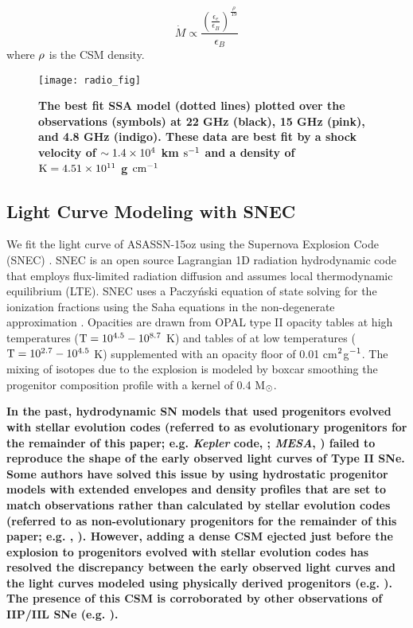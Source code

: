 \documentclass[a4paper,fleqn,usenatbib]{mnras}
\newcommand{\msunperiod}{M$\rm{_{\odot}}$}
\begin{document}
\begin{equation}
\dot{M} \propto \frac{\left(  \frac{\epsilon_{e}}{\epsilon_{B}}\right)^{\frac{\rho}{19}}} {\epsilon_{B}}
\end{equation}
where $\rm{\rho}$ is the CSM density.
\begin{figure}
\begin{center}
\texttt{[image: radio\_fig]}
\caption{\textbf{The best fit SSA model (dotted lines) plotted over the observations (symbols) at 22 GHz (black), 15 GHz (pink), and 4.8 GHz (indigo).
These data are best fit by a shock velocity of $\rm{\sim 1.4\times10^{4}}$ km $\rm{s^{-1}}$ and a density of $\rm{K = 4.51\times 10^{11}}$ g $\rm{cm^{-1}}$}}
\label{fig:radio}
\end{center}
\end{figure}
\subsection{Light Curve Modeling with SNEC}\label{sec:LCmodeling}
We fit the light curve of ASASSN-15oz using the Supernova Explosion Code (SNEC) \citep{2015morozova}.
SNEC is an open source Lagrangian 1D radiation hydrodynamic code that employs flux-limited radiation diffusion and assumes local thermodynamic equilibrium (LTE).
SNEC uses a Paczy\'nski equation of state \citep{1983paczynski} solving for the ionization fractions using the Saha equations in the non-degenerate approximation \citep{2000zaghloul}. 
Opacities are drawn from OPAL type II opacity tables \citep{1996iglesias} at high temperatures ($\rm{T=10^{4.5}-10^{8.7}}$ K) and tables of \citet{2005ferguson} at low temperatures ($\rm{T = 10^{2.7}-10^{4.5}}$ K) supplemented with an opacity floor of 0.01 cm$\rm{^2}$g$\rm{^{-1}}$. 
The mixing of isotopes due to the explosion is modeled by boxcar smoothing the progenitor composition profile with a kernel of 0.4 \msunperiod.

\textbf{In the past, hydrodynamic SN models that used progenitors evolved with stellar evolution codes (referred to as evolutionary progenitors for the remainder of this paper; e.g. {\it Kepler} code, \citealt{1978weaver,2007woosley,2015woosley, 2014sukhbold,2016sukhbold}; {\it MESA}, \citealt{2018paxton}) failed to reproduce the shape of the early observed light curves of Type II SNe. 
Some authors have solved this issue by using hydrostatic progenitor models with extended envelopes and density profiles that are set to match observations rather than calculated by stellar evolution codes (referred to as non-evolutionary progenitors for the remainder of this paper; e.g. \citealt{2008utrobin}, \citealt{2017utrobin}). 
However, adding a dense CSM ejected just before the explosion to progenitors evolved with stellar evolution codes has resolved the discrepancy between the early observed light curves and the light curves modeled using physically derived progenitors (e.g. \citealt{2018morozova,2015gezari,2018foerster}).
The presence of this CSM is corroborated by other observations of IIP/IIL SNe (e.g. \citealt{2017yaron,2018bullivant}).}
\end{document}
